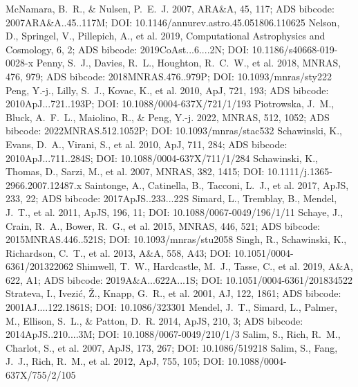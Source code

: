 \documentclass[twocolumn]{aastex631}
\begin{document}
\begin{thebibliography}{}
 McNamara, B.~R., \& Nulsen, P.~E.~J. 2007, ARA\&A, 45, 117; ADS bibcode: 2007ARA\&A..45..117M; DOI: 10.1146/annurev.astro.45.051806.110625
 Nelson, D., Springel, V., Pillepich, A., et al. 2019, Computational Astrophysics and Cosmology, 6, 2; ADS bibcode: 2019CoAst...6....2N; DOI: 10.1186/s40668-019-0028-x
 Penny, S.~J., Davies, R.~L., Houghton, R.~C.~W., et al. 2018, MNRAS, 476, 979; ADS bibcode: 2018MNRAS.476..979P; DOI: 10.1093/mnras/sty222
 Peng, Y.-j., Lilly, S.~J., Kovac, K., et al. 2010, ApJ, 721, 193; ADS bibcode: 2010ApJ...721..193P; DOI: 10.1088/0004-637X/721/1/193
 Piotrowska, J.~M., Bluck, A.~F.~L., Maiolino, R., \& Peng, Y.-j. 2022, MNRAS, 512, 1052; ADS bibcode: 2022MNRAS.512.1052P; DOI: 10.1093/mnras/stac532
 Schawinski, K., Evans, D.~A., Virani, S., et al. 2010, ApJ, 711, 284; ADS bibcode: 2010ApJ...711..284S; DOI: 10.1088/0004-637X/711/1/284
 Schawinski, K., Thomas, D., Sarzi, M., et al. 2007, MNRAS, 382, 1415; DOI: 10.1111/j.1365-2966.2007.12487.x
 Saintonge, A., Catinella, B., Tacconi, L.~J., et al. 2017, ApJS, 233, 22; ADS bibcode: 2017ApJS..233...22S
 Simard, L., Tremblay, B., Mendel, J.~T., et al. 2011, ApJS, 196, 11; DOI: 10.1088/0067-0049/196/1/11
 Schaye, J., Crain, R.~A., Bower, R.~G., et al. 2015, MNRAS, 446, 521; ADS bibcode: 2015MNRAS.446..521S; DOI: 10.1093/mnras/stu2058
 Singh, R., Schawinski, K., Richardson, C.~T., et al. 2013, A\&A, 558, A43; DOI: 10.1051/0004-6361/201322062
 Shimwell, T.~W., Hardcastle, M.~J., Tasse, C., et al. 2019, A\&A, 622, A1; ADS bibcode: 2019A\&A...622A...1S; DOI: 10.1051/0004-6361/201834522
 Strateva, I., Ivezi{\'c}, {\v Z}., Knapp, G.~R., et al. 2001, AJ, 122, 1861; ADS bibcode: 2001AJ....122.1861S; DOI: 10.1086/323301
 Mendel, J.~T., Simard, L., Palmer, M., Ellison, S.~L., \& Patton, D.~R. 2014, ApJS, 210, 3; ADS bibcode: 2014ApJS..210....3M; DOI: 10.1088/0067-0049/210/1/3
 Salim, S., Rich, R.~M., Charlot, S., et al. 2007, ApJS, 173, 267; DOI: 10.1086/519218
 Salim, S., Fang, J.~J., Rich, R.~M., et al. 2012, ApJ, 755, 105; DOI: 10.1088/0004-637X/755/2/105

\end{thebibliography}
\end{document}
